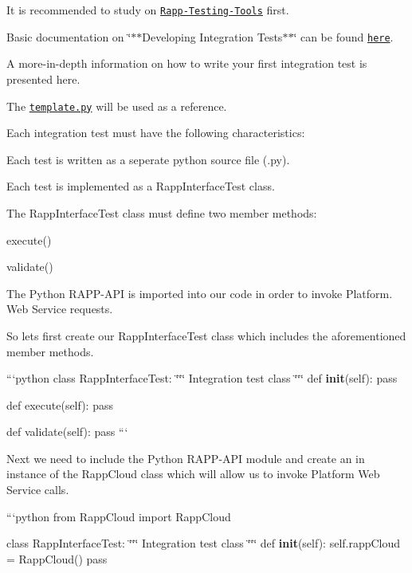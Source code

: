 It is recommended to study on \href{https://github.com/rapp-project/rapp-platform/wiki/RAPP-Testing-Tools}{\tt Rapp-\/\-Testing-\/\-Tools} first.

Basic documentation on \char`\"{}$\ast$$\ast$\-Developing Integration Tests$\ast$$\ast$\char`\"{} can be found \href{https://github.com/rapp-project/rapp-platform/tree/master/rapp_testing_tools}{\tt here}.

A more-\/in-\/depth information on how to write your first integration test is presented here.

The \href{https://github.com/rapp-project/rapp-platform/blob/master/rapp_testing_tools/scripts/default_tests/template.py}{\tt template.\-py} will be used as a reference.

Each integration test must have the following characteristics\-:


\begin{DoxyItemize}
\item Each test is written as a seperate python source file (.py).
\item Each test is implemented as a Rapp\-Interface\-Test class.
\item The Rapp\-Interface\-Test class must define two member methods\-:
\begin{DoxyItemize}
\item execute()
\item validate()
\end{DoxyItemize}
\item The Python R\-A\-P\-P-\/\-A\-P\-I is imported into our code in order to invoke Platform. Web Service requests.
\end{DoxyItemize}

So lets first create our Rapp\-Interface\-Test class which includes the aforementioned member methods.

```python class Rapp\-Interface\-Test\-: \char`\"{}\char`\"{}\char`\"{} Integration test class \char`\"{}\char`\"{}\char`\"{} def {\bfseries init}(self)\-: pass

def execute(self)\-: pass

def validate(self)\-: pass ```

Next we need to include the Python R\-A\-P\-P-\/\-A\-P\-I module and create an in instance of the Rapp\-Cloud class which will allow us to invoke Platform Web Service calls.

```python from Rapp\-Cloud import Rapp\-Cloud

class Rapp\-Interface\-Test\-: \char`\"{}\char`\"{}\char`\"{} Integration test class \char`\"{}\char`\"{}\char`\"{} def {\bfseries init}(self)\-: self.\-rapp\-Cloud = Rapp\-Cloud() pass

